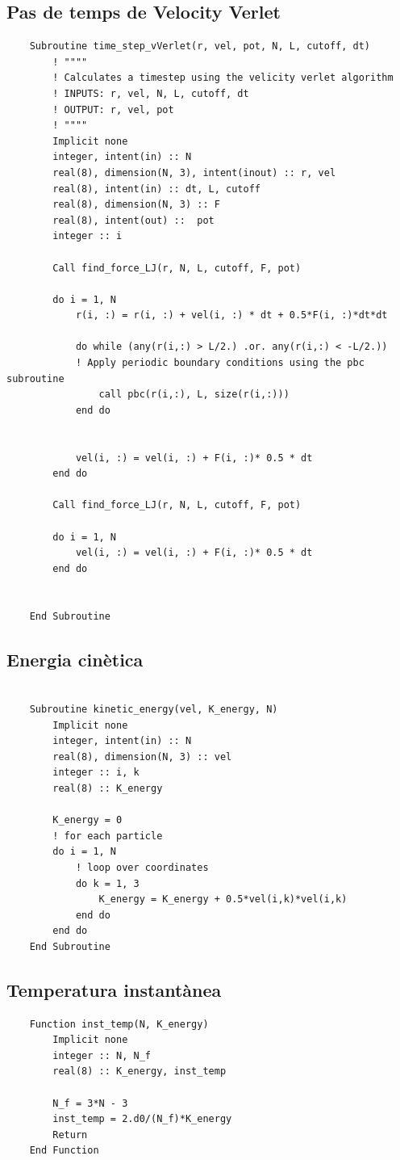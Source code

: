 \documentclass[a4paper,10pt]{article}
\begin{document}
\subsection{Pas de temps de Velocity Verlet}
\begin{lstlisting}
	Subroutine time_step_vVerlet(r, vel, pot, N, L, cutoff, dt)
		! """"
		! Calculates a timestep using the velicity verlet algorithm
		! INPUTS: r, vel, N, L, cutoff, dt
		! OUTPUT: r, vel, pot
		! """"
		Implicit none
		integer, intent(in) :: N
		real(8), dimension(N, 3), intent(inout) :: r, vel
		real(8), intent(in) :: dt, L, cutoff
		real(8), dimension(N, 3) :: F
		real(8), intent(out) ::  pot
		integer :: i
	
		Call find_force_LJ(r, N, L, cutoff, F, pot)
	
		do i = 1, N
			r(i, :) = r(i, :) + vel(i, :) * dt + 0.5*F(i, :)*dt*dt
	
			do while (any(r(i,:) > L/2.) .or. any(r(i,:) < -L/2.))
			! Apply periodic boundary conditions using the pbc subroutine
				call pbc(r(i,:), L, size(r(i,:)))
			end do
	
	
			vel(i, :) = vel(i, :) + F(i, :)* 0.5 * dt
		end do
	
		Call find_force_LJ(r, N, L, cutoff, F, pot)
	
		do i = 1, N
			vel(i, :) = vel(i, :) + F(i, :)* 0.5 * dt
		end do
	
	
	End Subroutine
\end{lstlisting}

\subsection{Energia cinètica}

\begin{lstlisting}
	
	Subroutine kinetic_energy(vel, K_energy, N)
		Implicit none
		integer, intent(in) :: N
		real(8), dimension(N, 3) :: vel
		integer :: i, k
		real(8) :: K_energy
		
		K_energy = 0
		! for each particle
		do i = 1, N
			! loop over coordinates
			do k = 1, 3
				K_energy = K_energy + 0.5*vel(i,k)*vel(i,k) 
			end do
		end do
	End Subroutine
\end{lstlisting}

\subsection{Temperatura instantànea}
	\begin{lstlisting}
	Function inst_temp(N, K_energy)
		Implicit none
		integer :: N, N_f
		real(8) :: K_energy, inst_temp
		
		N_f = 3*N - 3
		inst_temp = 2.d0/(N_f)*K_energy
		Return
	End Function
	\end{lstlisting}	
	
\end{document}
